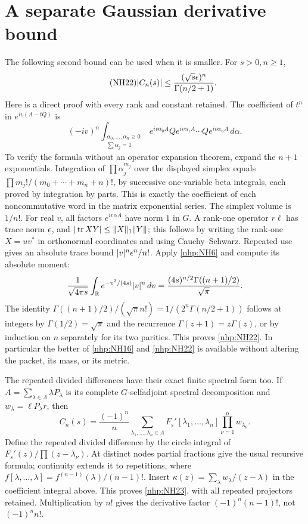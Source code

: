 \documentclass[11pt]{article}
\begin{document}
\section{A separate Gaussian derivative bound}

The following second bound can be used when it is smaller.
For \(s>0,n\ge1\),
\begin{equation}\tag{NH22}\label{nhp:NH22}
|C_n(s)|\le
\frac{(\sqrt{s}\epsilon)^n}{\Gamma(n/2+1)} .
\end{equation}
Here is a direct proof with every rank and constant retained.
The coefficient of \(t^n\) in \(e^{iv(A-tQ)}\) is
\[
(-iv)^n\int_{\substack{\alpha_0,\ldots,\alpha_n\ge0\\
                       \sum\alpha_j=1}}
e^{iv\alpha_0A}Qe^{iv\alpha_1A}\cdots
Qe^{iv\alpha_nA}\,d\alpha .
\]
To verify the formula without an operator expansion theorem,
expand the \(n+1\) exponentials. Integration of
\(\prod\alpha_j^{m_j}\) over the displayed simplex equals
\(\prod m_j!/(m_0+\cdots+m_n+n)!\), by successive
one-variable beta integrals, each proved by integration
by parts. This is exactly the coefficient of each
noncommutative word in the matrix exponential series.
The simplex volume is \(1/n!\).
For real \(v\), all factors \(e^{iv\alpha A}\) have
norm \(1\) in \(G\). A rank-one operator \(r\ell\)
has trace norm \(\epsilon\), and
\(|\operatorname{tr} XY|\le\|X\|_1\|Y\|\); this follows by writing
the rank-one \(X=uv^*\) in orthonormal coordinates and
using Cauchy--Schwarz. Repeated use gives an absolute
trace bound \(|v|^n\epsilon^n/n!\).
Apply \eqref{nhp:NH6} and compute its absolute moment:
\[
\frac1{\sqrt{4\pi s}}\int_\mathbb R
e^{-v^2/(4s)}|v|^n\,dv
=\frac{(4s)^{n/2}\Gamma((n+1)/2)}{\sqrt\pi}.
\]
The identity
\(\Gamma((n+1)/2)/(\sqrt\pi n!)
=1/(2^n\Gamma(n/2+1))\) follows at integers by
\(\Gamma(1/2)=\sqrt\pi\) and the recurrence
\(\Gamma(z+1)=z\Gamma(z)\), or by induction on \(n\)
separately for its two parities.
This proves \eqref{nhp:NH22}. In particular the better of
\eqref{nhp:NH16} and \eqref{nhp:NH22} is available without
altering the packet, its mass, or its metric.

The repeated divided differences have their exact finite
spectral form too. If
\(A=\sum_{\lambda\in\Lambda}\lambda P_\lambda\) is its
complete \(G\)-selfadjoint spectral decomposition and
\(w_\lambda=\ell P_\lambda r\), then
\begin{equation}\tag{NH23}\label{nhp:NH23}
C_n(s)=\frac{(-1)^n}{n}
\sum_{\lambda_1,\ldots,\lambda_n\in\Lambda}
F_s'[\lambda_1,\ldots,\lambda_n]
\prod_{\nu=1}^n w_{\lambda_\nu}.
\end{equation}
Define the repeated divided difference by the circle
integral of \(F_s'(z)/\prod(z-\lambda_\nu)\).
At distinct nodes partial fractions give the usual
recursive formula; continuity extends it to repetitions,
where \(f[\lambda,\ldots,\lambda]=f^{(n-1)}(\lambda)/(n-1)!\).
Insert
\(\kappa(z)=\sum_\lambda w_\lambda/(z-\lambda)\)
in the coefficient integral above. This proves
\eqref{nhp:NH23}, with all repeated projectors retained.
Multiplication by \(n!\) gives the derivative factor
\((-1)^n(n-1)!\), not \((-1)^nn!\).
\end{document}
